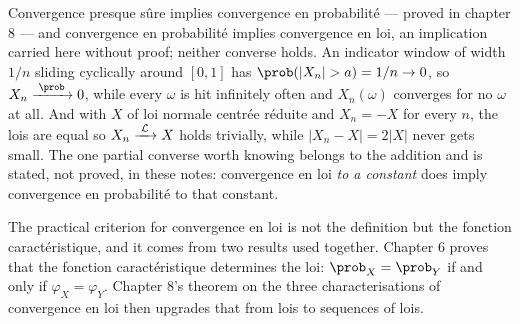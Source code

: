 \begin{figure}[h!]
  \centering
\end{figure}

\begin{remark}
  Convergence presque sûre implies convergence en probabilité --- proved in
  chapter 8 --- and convergence en probabilité implies convergence en loi,
  an implication carried here without proof; neither converse holds. An indicator
  window of width $1/n$ sliding cyclically around $[0,1]$ has $\prob(|X_{n}| > a)
  = 1/n \to 0$, so $X_{n} \cvP 0$, while every $\omega$ is hit infinitely often
  and $X_{n}(\omega)$
  converges for no $\omega$ at all. And with $X$ of loi normale centrée réduite and
  $X_{n} = -X$ for every $n$, the lois are equal so $X_{n} \xrightarrow{\;\mathcal{L}\;} X$ holds trivially,
  while $|X_{n} - X| = 2|X|$ never gets small. The one partial converse worth
  knowing belongs to the addition and is stated, not proved, in these notes:
  convergence en loi \emph{to a constant} does imply convergence en probabilité to
  that constant.
\end{remark}

The practical criterion for convergence en loi is not the definition but the
fonction caractéristique, and it comes from two results used together. Chapter 6
proves that the fonction caractéristique determines the loi:
$\prob_{X} = \prob_{Y}$ if and only if $\varphi_{X} = \varphi_{Y}$. Chapter 8's
theorem on the three characterisations of convergence en loi then upgrades that
from lois to sequences of lois.

